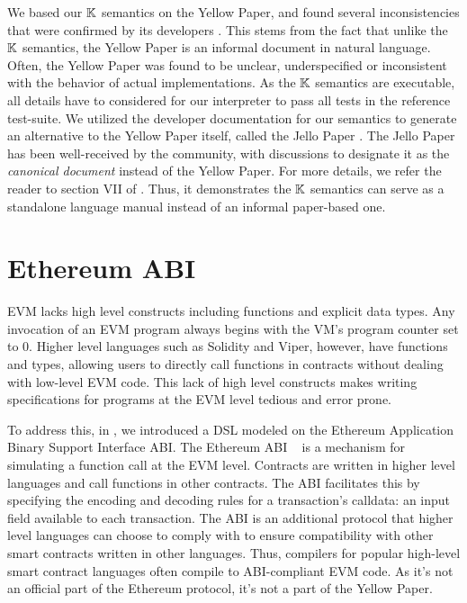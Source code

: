 We based our $\mathbb{K}$ semantics on the Yellow Paper, and
found several inconsistencies that were confirmed by its developers \cite{HildenbrandtCSF18}.
This stems from the fact that unlike the $\mathbb{K}$ semantics,
the Yellow Paper is an informal document in natural language.
Often, the Yellow Paper was found to be unclear, underspecified
or inconsistent with the behavior of actual implementations.
As the $\mathbb{K}$ semantics are executable, all details have to
considered for our interpreter to pass all tests in the reference
test-suite. We utilized the developer documentation for our semantics
to generate an alternative to the Yellow Paper itself, called the Jello Paper
\cite{EvmJellopaperUrl}. The Jello Paper has been well-received by the
community, with discussions to designate it as the \emph{canonical document}
instead of the Yellow Paper. For more details, we refer the reader to
section VII of \cite{HildenbrandtCSF18}. Thus, it demonstrates the $\mathbb{K}$ semantics
can serve as a standalone language manual instead of an informal paper-based
one.

\section{Ethereum ABI \DSL{}}\label{sec:ethereum-abi-dsl}

EVM lacks high level constructs including functions and explicit data types.
Any invocation of an EVM program always begins with the VM’s program counter set to 0.
Higher level languages such as Solidity and Viper, however, have functions and types, allowing users to directly call functions in contracts without dealing with low-level EVM code.
This lack of high level constructs makes writing specifications for programs
at the EVM level tedious and error prone.

To address this, in \cite{HildenbrandtCSF18}, we introduced a DSL modeled on the
Ethereum Application Binary Support Interface ABI.
The Ethereum ABI ~\cite{EthereumAbiUrl} is a mechanism for simulating a function call at the EVM level.
Contracts are written in higher level languages and call functions in other contracts.
The ABI facilitates this by specifying the encoding and decoding rules for a transaction's
calldata: an input field available to each transaction. The ABI
is an additional protocol that higher level
languages can choose to comply with to ensure compatibility with other smart
contracts written in other languages. Thus, compilers for popular high-level
smart contract languages often compile to ABI-compliant EVM code. As it's not
an official part of the Ethereum protocol, it's not a part of the Yellow Paper.


